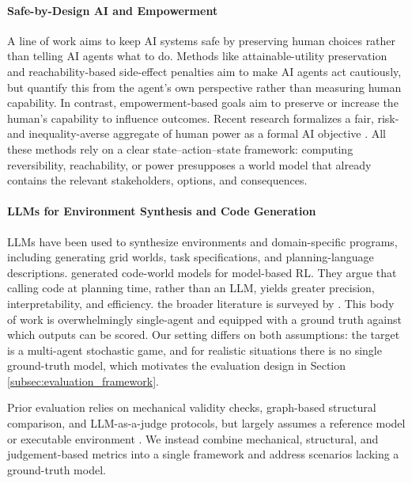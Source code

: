 \documentclass{article}
\begin{document}
\paragraph{Safe-by-Design AI and Empowerment}
A line of work aims to keep AI systems safe by preserving human choices rather than telling AI agents what to do. Methods like attainable-utility preservation \citep{turner2020conservative} and reachability-based side-effect penalties \citep{krakovna2020avoiding} aim to make AI agents act cautiously, but quantify this from the agent's own perspective rather than measuring human capability. In contrast, empowerment-based goals aim to preserve or increase the human's capability to influence outcomes. Recent research formalizes a fair, risk- and inequality-averse aggregate of human power as a formal AI objective \citet{heitzigfair}. All these methods rely on a clear state–action–state framework: computing reversibility, reachability, or power presupposes a world model that already contains the relevant stakeholders, options, and consequences. 

\paragraph{LLMs for Environment Synthesis and Code Generation}
LLMs have been used to synthesize environments and domain-specific programs, including generating grid worlds, task specifications, and planning-language descriptions. \citet{dainese2024generating} generated code-world models for model-based RL. They argue that calling code at planning time, rather than an LLM, yields greater precision, interpretability, and efficiency. the broader literature is surveyed by \citet{cao2025large}. This body of work is overwhelmingly single-agent and equipped with a ground truth against which outputs can be scored. Our setting differs on both assumptions: the target is a multi-agent stochastic game, and for realistic situations there is no single ground-truth model, which motivates the evaluation design in Section \ref{subsec:evaluation_framework}. 

Prior evaluation relies on mechanical validity checks, graph-based structural comparison, and LLM-as-a-judge protocols, but largely assumes a reference model or executable environment \citet{hu2025text2worldbenchmarkinglargelanguage}. We instead combine mechanical, structural, and judgement-based metrics into a single framework and address scenarios lacking a ground-truth model.
\end{document}

